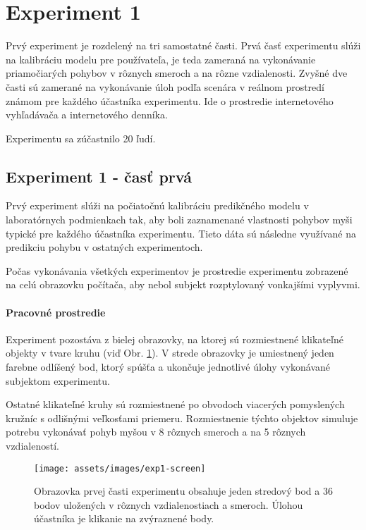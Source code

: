 \section{Experiment 1\label{sec:exp1}}
Prvý experiment je rozdelený na tri samostatné časti. Prvá časť experimentu slúži na kalibráciu modelu pre používateľa, je teda zameraná na vykonávanie priamočiarých pohybov v rôznych smeroch a na rôzne vzdialenosti. Zvyšné dve časti sú zamerané na vykonávanie úloh podľa scenára v reálnom prostredí známom pre každého účastníka experimentu. Ide o prostredie internetového vyhľadávača a internetového denníka.

Experimentu sa zúčastnilo 20 ľudí.

\subsection{Experiment 1 - časť prvá}
Prvý experiment slúži na počiatočnú kalibráciu predikčného modelu v laboratórnych podmienkach tak, aby boli zaznamenané vlastnosti pohybov myši typické pre každého účastníka experimentu. Tieto dáta sú následne využívané na predikciu pohybu v ostatných experimentoch.

Počas vykonávania všetkých experimentov je prostredie experimentu zobrazené na celú obrazovku počítača, aby nebol subjekt rozptylovaný vonkajšími vyplyvmi.

\paragraph{Pracovné prostredie}
Experiment pozostáva z bielej obrazovky, na ktorej sú rozmiestnené klikateľné objekty v tvare kruhu (viď Obr. \ref{fig:exp1-screen}). V strede obrazovky je umiestnený jeden farebne odlíšený bod, ktorý spúšťa a ukončuje jednotlivé úlohy vykonávané subjektom experimentu.

Ostatné klikateľné kruhy sú rozmiestnené po obvodoch viacerých pomyslených kružníc s odlišnými veľkosťami priemeru. Rozmiestnenie týchto objektov simuluje potrebu vykonávať pohyb myšou v 8 rôznych smeroch a na 5 rôznych vzdialeností.


\begin{figure}[h]
\centering
\texttt{[image: assets/images/exp1-screen]}
\caption{Obrazovka prvej časti experimentu obsahuje jeden stredový bod a 36 bodov uložených v rôznych vzdialenostiach a smeroch. Úlohou účastníka je klikanie na zvýraznené body. \label{fig:exp1-screen}}
\end{figure}

